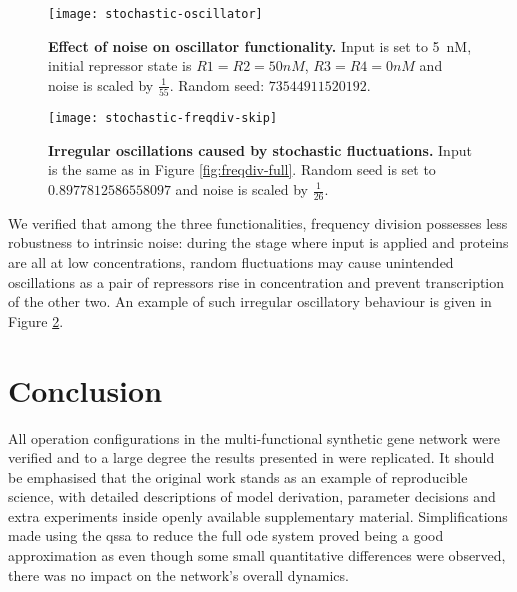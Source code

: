     \begin{figure}[!htb]
      \centering
      \texttt{[image: stochastic-oscillator]}
      \caption{\textbf{Effect of noise on oscillator functionality.} Input is set to \SI{5}{\nano M}, initial repressor state is $R1 = R2 = 50nM$, $R3 = R4 = 0nM$ and noise is scaled by $\frac{1}{55}$. Random seed: $73544911520192$.}
      \label{fig:stochastic-oscillator}
    \end{figure}

    \begin{figure}[!htbp]
      \centering
      \texttt{[image: stochastic-freqdiv-skip]}
      \caption{\textbf{Irregular oscillations caused by stochastic fluctuations.} Input is the same as in Figure \ref{fig:freqdiv-full}. Random seed is set to $0.8977812586558097$ and noise is scaled by $\frac{1}{26}$.}
      \label{fig:stochastic-freqdiv-skip}
    \end{figure}

    We verified that among the three functionalities, frequency division possesses less robustness to intrinsic noise: during the stage where input is applied and proteins are all at low concentrations, random fluctuations may cause unintended oscillations as a pair of repressors rise in concentration and prevent transcription of the other two.
    An example of such irregular oscillatory behaviour is given in Figure \ref{fig:stochastic-freqdiv-skip}.


\section{Conclusion}

  All operation configurations in the multi-functional synthetic gene network were verified and to a large degree the results presented in \cite{multif} were replicated.
  It should be emphasised that the original work stands as an example of reproducible science, with detailed descriptions of model derivation, parameter decisions and extra experiments inside openly available supplementary material.
  Simplifications made using the \ac{qssa} to reduce the full \ac{ode} system proved being a good approximation as even though some small quantitative differences were observed, there was no impact on the network's overall dynamics.

